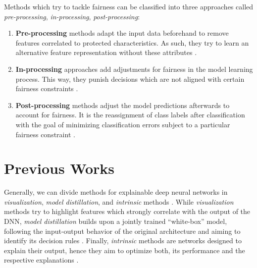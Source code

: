 Methods which try to tackle fairness can be classified into three approaches called \emph{pre-processing}, \emph{in-processing}, \emph{post-processing}:
\begin{enumerate}
    \item \textbf{Pre-processing} methods adapt the input data beforehand to remove features correlated to protected characteristics. As such, they try to learn an alternative feature representation without these attributes \citep{GordalizaBGL19, CalmonWVRV17, LouizosSLWZ15, ZemelWSPD13}. 
    \item \textbf{In-processing} approaches add adjustments for fairness in the model learning process. This way, they punish decisions which are not aligned with certain fairness constraints \citep{DworkIKL18, DoniniOBSP18, AgarwalBD0W18}.
    \item \textbf{Post-processing} methods adjust the model predictions afterwards to account for fairness. It is the reassignment of class labels after classification with the goal of minimizing 
    classification errors subject to a particular fairness constraint \citep{HardtPNS16,PleissRWKW17, FeldmanFMSV15}.
\end{enumerate}


\section{Previous Works}



 
 Generally, we can divide methods for explainable deep neural networks in \emph{visualization}, \emph{model distillation}, and \emph{intrinsic} methods \citep{xie2020explainable}. While \emph{visualization} methods try to highlight features which strongly correlate with the output of the DNN, \emph{model distillation} builds upon a jointly trained ``white-box'' model, following the input-output behavior of the original architecture and aiming to identify its decision rules \citep{xie2020explainable}. Finally, \emph{intrinsic} methods are networks designed to explain their output, hence they aim to optimize both, its performance and the respective explanations \citep{xie2020explainable}.

